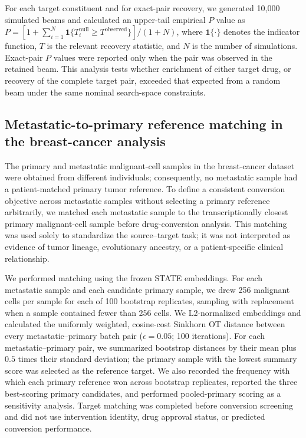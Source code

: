 \documentclass[11pt,a4paper]{article}
\begin{document}
For each target constituent and for exact-pair recovery, we generated 10,000 simulated beams and calculated an upper-tail empirical $P$ value as $P=[1+\sum_{i=1}^{N}\mathbf{1}\{T_i^{\mathrm{null}}\geq T^{\mathrm{observed}}\}]/(1+N)$, where $\mathbf{1}\{\cdot\}$ denotes the indicator function, $T$ is the relevant recovery statistic, and $N$ is the number of simulations. Exact-pair $P$ values were reported only when the pair was observed in the retained beam. This analysis tests whether enrichment of either target drug, or recovery of the complete target pair, exceeded that expected from a random beam under the same nominal search-space constraints.

\subsection{Metastatic-to-primary reference matching in the breast-cancer analysis}
The primary and metastatic malignant-cell samples in the breast-cancer dataset were obtained from different individuals; consequently, no metastatic sample had a patient-matched primary tumor reference. To define a consistent conversion objective across metastatic samples without selecting a primary reference arbitrarily, we matched each metastatic sample to the transcriptionally closest primary malignant-cell sample before drug-conversion analysis. This matching was used solely to standardize the source--target task; it was not interpreted as evidence of tumor lineage, evolutionary ancestry, or a patient-specific clinical relationship.

We performed matching using the frozen STATE embeddings. For each metastatic sample and each candidate primary sample, we drew 256 malignant cells per sample for each of 100 bootstrap replicates, sampling with replacement when a sample contained fewer than 256 cells. We L2-normalized embeddings and calculated the uniformly weighted, cosine-cost Sinkhorn OT distance between every metastatic--primary batch pair ($\epsilon=0.05$; 100 iterations). For each metastatic--primary pair, we summarized bootstrap distances by their mean plus $0.5$ times their standard deviation; the primary sample with the lowest summary score was selected as the reference target. We also recorded the frequency with which each primary reference won across bootstrap replicates, reported the three best-scoring primary candidates, and performed pooled-primary scoring as a sensitivity analysis. Target matching was completed before conversion screening and did not use intervention identity, drug approval status, or predicted conversion performance.
\end{document}

